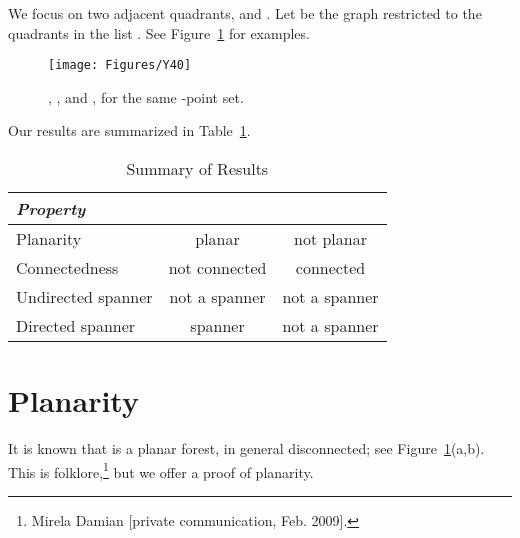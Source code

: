 \pdfoutput=1  \documentclass[]{article}
\newcommand{\tablab}[1]{\label{tab:#1}}
\newcommand{\figlab}[1]{\label{fig:#1}}
\newcommand{\figref}[1]{\ref{fig:#1}}
\newcommand{\tabref}[1]{\ref{tab:#1}}
\begin{document}
We focus on two adjacent quadrants,  and .
Let  be the  graph restricted to the 
quadrants in the list .
See Figure~\figref{Y40} for examples.
\begin{figure}[htbp]
\centering
\texttt{[image: Figures/Y40]}
\caption{, , and , for the same -point set.}
\figlab{Y40}
\end{figure}


Our results are summarized in Table~\tabref{Results}.
\begin{table}[htbp]
\begin{center}
\begin{tabular}{| l || c | c |}
\hline
\emph{Property} &  &  
\\ \hline \hline
Planarity & planar & not planar
\\ \hline
Connectedness & not connected & connected 
\\ \hline
Undirected spanner & not a spanner & not a spanner 
\\ \hline
Directed spanner & spanner & not a spanner
\\ \hline
\end{tabular}
\end{center}
\tablab{Results}
\caption{Summary of Results}
\end{table}

\section{Planarity}
It is known that  is a planar forest, in general disconnected;
see Figure~\figref{Y40}(a,b).
This is folklore,\footnote{
Mirela Damian [private communication, Feb. 2009].
}
but we offer a proof of planarity.
\end{document}
